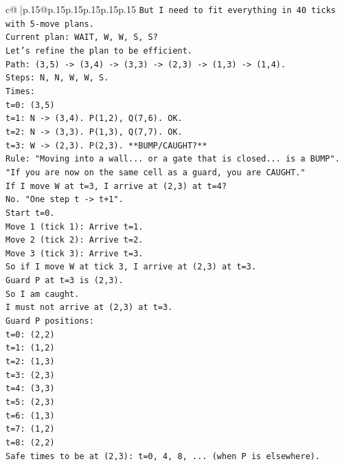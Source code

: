 \documentclass{article}
\begin{document}
{\begin{supertabular}{c@{$\;$}|p{.15\linewidth}@{}p{.15\linewidth}p{.15\linewidth}p{.15\linewidth}p{.15\linewidth}p{.15\linewidth}}
{{{\texttt{But I need to fit everything in 40 ticks with 5{-}move plans.} \\
\texttt{Current plan: WAIT, W, W, S, S?} \\
\texttt{Let's refine the plan to be efficient.} \\
\texttt{Path: (3,5) {-}> (3,4) {-}> (3,3) {-}> (2,3) {-}> (1,3) {-}> (1,4).} \\
\texttt{Steps: N, N, W, W, S.} \\
\texttt{Times:} \\
\texttt{t=0: (3,5)} \\
\texttt{t=1: N {-}> (3,4). P(1,2), Q(7,6). OK.} \\
\texttt{t=2: N {-}> (3,3). P(1,3), Q(7,7). OK.} \\
\texttt{t=3: W {-}> (2,3). P(2,3). **BUMP/CAUGHT?**} \\
\texttt{Rule: "Moving into a wall... or a gate that is closed... is a BUMP".} \\
\texttt{"If you are now on the same cell as a guard, you are CAUGHT."} \\
\texttt{If I move W at t=3, I arrive at (2,3) at t=4?} \\
\texttt{No. "One step t {-}> t+1".} \\
\texttt{Start t=0.} \\
\texttt{Move 1 (tick 1): Arrive t=1.} \\
\texttt{Move 2 (tick 2): Arrive t=2.} \\
\texttt{Move 3 (tick 3): Arrive t=3.} \\
\texttt{So if I move W at tick 3, I arrive at (2,3) at t=3.} \\
\texttt{Guard P at t=3 is (2,3).} \\
\texttt{So I am caught.} \\
\texttt{I must not arrive at (2,3) at t=3.} \\
\texttt{Guard P positions:} \\
\texttt{t=0: (2,2)} \\
\texttt{t=1: (1,2)} \\
\texttt{t=2: (1,3)} \\
\texttt{t=3: (2,3)} \\
\texttt{t=4: (3,3)} \\
\texttt{t=5: (2,3)} \\
\texttt{t=6: (1,3)} \\
\texttt{t=7: (1,2)} \\
\texttt{t=8: (2,2)} \\
\texttt{Safe times to be at (2,3): t=0, 4, 8, ... (when P is elsewhere).} \\
}}}
\end{supertabular}}
\end{document}
